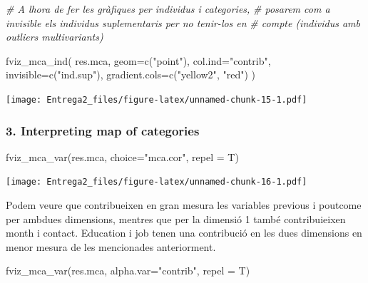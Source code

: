 \documentclass[
]{article}
\newenvironment{Shaded}{\begin{snugshade}}{\end{snugshade}}
\newcommand{\AttributeTok}[1]{\textcolor[rgb]{0.77,0.63,0.00}{#1}}
\newcommand{\CommentTok}[1]{\textcolor[rgb]{0.56,0.35,0.01}{\textit{#1}}}
\newcommand{\FunctionTok}[1]{\textcolor[rgb]{0.00,0.00,0.00}{#1}}
\newcommand{\NormalTok}[1]{#1}
\newcommand{\StringTok}[1]{\textcolor[rgb]{0.31,0.60,0.02}{#1}}
\begin{document}
\begin{Shaded}
\begin{Highlighting}[]
\CommentTok{\# A l\textquotesingle{}hora de fer les gràfiques per individus i categories,}
\CommentTok{\# posarem com a invisible els individus suplementaris per no tenir{-}los en}
\CommentTok{\# compte (individus amb outliers multivariants)}

\FunctionTok{fviz\_mca\_ind}\NormalTok{(}
\NormalTok{  res.mca,}
  \AttributeTok{geom=}\FunctionTok{c}\NormalTok{(}\StringTok{"point"}\NormalTok{),}
  \AttributeTok{col.ind=}\StringTok{"contrib"}\NormalTok{,}
  \AttributeTok{invisible=}\FunctionTok{c}\NormalTok{(}\StringTok{"ind.sup"}\NormalTok{),}
  \AttributeTok{gradient.cols=}\FunctionTok{c}\NormalTok{(}\StringTok{"yellow2"}\NormalTok{, }\StringTok{"red"}\NormalTok{)}
\NormalTok{)}
\end{Highlighting}
\end{Shaded}

\texttt{[image: Entrega2\_files/figure-latex/unnamed-chunk-15-1.pdf]}

\hypertarget{interpreting-map-of-categories}{%
\subsubsection{3. Interpreting map of
categories}\label{interpreting-map-of-categories}}

\begin{Shaded}
\begin{Highlighting}[]
\FunctionTok{fviz\_mca\_var}\NormalTok{(res.mca,}
             \AttributeTok{choice=}\StringTok{"mca.cor"}\NormalTok{,}
             \AttributeTok{repel =}\NormalTok{ T)}
\end{Highlighting}
\end{Shaded}

\texttt{[image: Entrega2\_files/figure-latex/unnamed-chunk-16-1.pdf]}

Podem veure que contribueixen en gran mesura les variables previous i
poutcome per ambdues dimensions, mentres que per la dimensió 1 també
contribuieixen month i contact. Education i job tenen una contribució en
les dues dimensions en menor mesura de les mencionades anteriorment.

\begin{Shaded}
\begin{Highlighting}[]
\FunctionTok{fviz\_mca\_var}\NormalTok{(res.mca,}
             \AttributeTok{alpha.var=}\StringTok{"contrib"}\NormalTok{,}
             \AttributeTok{repel =}\NormalTok{ T)}
\end{Highlighting}
\end{Shaded}
\end{document}
